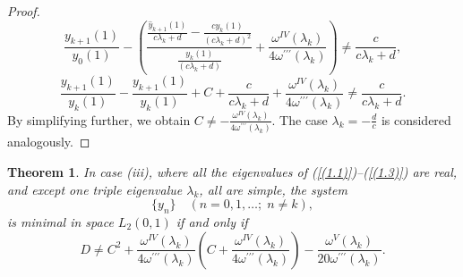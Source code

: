 \documentclass[pdflatex,sn-mathphys-num]{sn-jnl}%
\theoremstyle{thmstyleone}%
\theoremstyle{thmstyletwo}%
\theoremstyle{thmstylethree}%
\newtheorem{thm}{Theorem}[section]
\theoremstyle{definition}
\theoremstyle{remark}
\numberwithin{equation}{section}
\begin{document}
\begin{proof}
$$
\frac{{y}_{k+1}(1)}{y_{0}(1)}- \left(\frac{\frac{\hat{y}_{k+1}(1)}{c\lambda_{k}+d} - \frac{cy_{k}(1)}{{(c\lambda_{k}+d)}^{2}}}{\frac{y_{k}(1)}{{(c\lambda_{k}+d)}}}+\frac{\omega^{IV}(\lambda_k)}{4\omega^{\prime\prime\prime}(\lambda_k)}\right)\neq\frac{c}{c\lambda_{k}+d} ,
$$
$$
\frac{{y}_{k+1}(1)}{y_{k}(1)}-\frac{{y}_{k+1}(1)}{y_{k}(1)}+C+ \frac{c}{c\lambda_{k}+d}+\frac{\omega^{IV}(\lambda_k)}{4\omega^{\prime\prime\prime}(\lambda_k)}\neq\frac{c}{c\lambda_{k}+d}.
$$
By simplifying further, we obtain
$C\neq-\frac{\omega^{IV}(\lambda_k)}{4\omega^{\prime\prime\prime}(\lambda_k)}$.
The case $\lambda_k=-\frac{d}{c}$ is considered analogously.
\end{proof}
\begin{thm}
In case (iii), where  all the eigenvalues of (\ref{(1.1)})--(\ref{(1.3)}) are real, and except one triple eigenvalue $\lambda_k$, all are simple, the system
\begin{equation}
  \{ y_n \} \quad (n = 0,1,\ldots;\; n \neq k), \label{(6.24)} 
\end{equation}
is minimal in space $L_2(0,1)$ if and only if
\begin{equation}
 D\neq C^2+
\frac{\omega^{IV}(\lambda_k)}{4\omega^{\prime\prime\prime}(\lambda_k)}\left(C+\frac{\omega^{IV}(\lambda_k)}{4\omega^{\prime\prime\prime}(\lambda_k)}\right)-\frac{\omega^{V}(\lambda_k)}{20\omega^{\prime\prime\prime}(\lambda_k)}. \label{(6.25)}  
\end{equation}
\end{thm}
\end{document}
